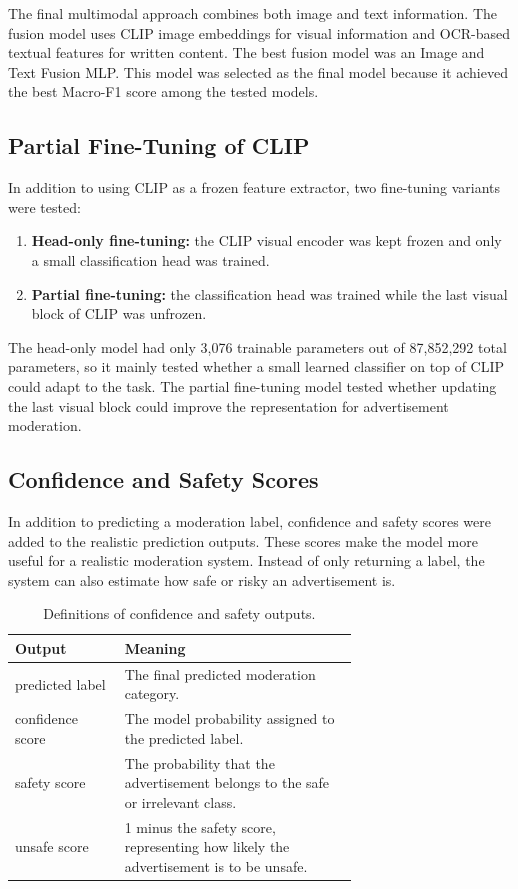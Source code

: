 \documentclass[12pt]{article}
\begin{document}
The final multimodal approach combines both image and text information. The fusion model uses CLIP image embeddings for visual information and OCR-based textual features for written content. The best fusion model was an Image and Text Fusion MLP. This model was selected as the final model because it achieved the best Macro-F1 score among the tested models.

\subsection{Partial Fine-Tuning of CLIP}

In addition to using CLIP as a frozen feature extractor, two fine-tuning variants were tested:
\begin{enumerate}
    \item \textbf{Head-only fine-tuning:} the CLIP visual encoder was kept frozen and only a small classification head was trained.
    \item \textbf{Partial fine-tuning:} the classification head was trained while the last visual block of CLIP was unfrozen.
\end{enumerate}

The head-only model had only 3,076 trainable parameters out of 87,852,292 total parameters, so it mainly tested whether a small learned classifier on top of CLIP could adapt to the task. The partial fine-tuning model tested whether updating the last visual block could improve the representation for advertisement moderation.

\subsection{Confidence and Safety Scores}

In addition to predicting a moderation label, confidence and safety scores were added to the realistic prediction outputs. These scores make the model more useful for a realistic moderation system. Instead of only returning a label, the system can also estimate how safe or risky an advertisement is.

\begin{table}[H]
\centering
\begin{tabular}{lp{0.68\linewidth}}
\toprule
\textbf{Output} & \textbf{Meaning} \\
\midrule
predicted label & The final predicted moderation category. \\
confidence score & The model probability assigned to the predicted label. \\
safety score & The probability that the advertisement belongs to the safe or irrelevant class. \\
unsafe score & 1 minus the safety score, representing how likely the advertisement is to be unsafe. \\
\bottomrule
\end{tabular}
\caption{Definitions of confidence and safety outputs.}
\label{tab:safety_scores}
\end{table}
\end{document}
